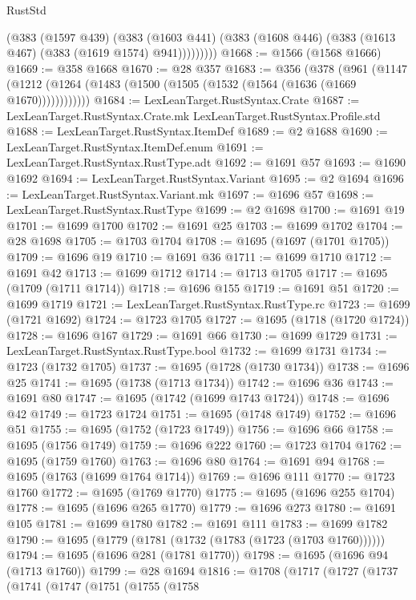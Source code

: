 \begin{lexlean}{RustStd}
\begin{coremodule}
            (@383
              (@1597 @439)
              (@383
                (@1603 @441)
                (@383 (@1608 @446) (@383 (@1613 @467) (@383 (@1619 @1574) @941)))))))))
@1668 := @1566 (@1568 @1666)
@1669 := @358 @1668
@1670 := @28 @357
@1683 := @356
    (@378
      (@961 (@1147 (@1212 (@1264 (@1483 (@1500 (@1505 (@1532 (@1564 (@1636 (@1669 @1670))))))))))))
@1684 := LexLeanTarget.RustSyntax.Crate
@1687 := LexLeanTarget.RustSyntax.Crate.mk LexLeanTarget.RustSyntax.Profile.std
@1688 := LexLeanTarget.RustSyntax.ItemDef
@1689 := @2 @1688
@1690 := LexLeanTarget.RustSyntax.ItemDef.enum
@1691 := LexLeanTarget.RustSyntax.RustType.adt
@1692 := @1691 @57
@1693 := @1690 @1692
@1694 := LexLeanTarget.RustSyntax.Variant
@1695 := @2 @1694
@1696 := LexLeanTarget.RustSyntax.Variant.mk
@1697 := @1696 @57
@1698 := LexLeanTarget.RustSyntax.RustType
@1699 := @2 @1698
@1700 := @1691 @19
@1701 := @1699 @1700
@1702 := @1691 @25
@1703 := @1699 @1702
@1704 := @28 @1698
@1705 := @1703 @1704
@1708 := @1695 (@1697 (@1701 @1705))
@1709 := @1696 @19
@1710 := @1691 @36
@1711 := @1699 @1710
@1712 := @1691 @42
@1713 := @1699 @1712
@1714 := @1713 @1705
@1717 := @1695 (@1709 (@1711 @1714))
@1718 := @1696 @155
@1719 := @1691 @51
@1720 := @1699 @1719
@1721 := LexLeanTarget.RustSyntax.RustType.rc
@1723 := @1699 (@1721 @1692)
@1724 := @1723 @1705
@1727 := @1695 (@1718 (@1720 @1724))
@1728 := @1696 @167
@1729 := @1691 @66
@1730 := @1699 @1729
@1731 := LexLeanTarget.RustSyntax.RustType.bool
@1732 := @1699 @1731
@1734 := @1723 (@1732 @1705)
@1737 := @1695 (@1728 (@1730 @1734))
@1738 := @1696 @25
@1741 := @1695 (@1738 (@1713 @1734))
@1742 := @1696 @36
@1743 := @1691 @80
@1747 := @1695 (@1742 (@1699 @1743 @1724))
@1748 := @1696 @42
@1749 := @1723 @1724
@1751 := @1695 (@1748 @1749)
@1752 := @1696 @51
@1755 := @1695 (@1752 (@1723 @1749))
@1756 := @1696 @66
@1758 := @1695 (@1756 @1749)
@1759 := @1696 @222
@1760 := @1723 @1704
@1762 := @1695 (@1759 @1760)
@1763 := @1696 @80
@1764 := @1691 @94
@1768 := @1695 (@1763 (@1699 @1764 @1714))
@1769 := @1696 @111
@1770 := @1723 @1760
@1772 := @1695 (@1769 @1770)
@1775 := @1695 (@1696 @255 @1704)
@1778 := @1695 (@1696 @265 @1770)
@1779 := @1696 @273
@1780 := @1691 @105
@1781 := @1699 @1780
@1782 := @1691 @111
@1783 := @1699 @1782
@1790 := @1695 (@1779 (@1781 (@1732 (@1783 (@1723 (@1703 @1760))))))
@1794 := @1695 (@1696 @281 (@1781 @1770))
@1798 := @1695 (@1696 @94 (@1713 @1760))
@1799 := @28 @1694
@1816 := @1708
    (@1717
      (@1727
        (@1737
          (@1741
            (@1747
              (@1751
                (@1755
                  (@1758

\end{coremodule}
\end{lexlean}
